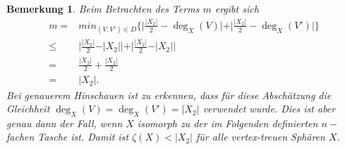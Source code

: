 \documentclass[12pt,titlepage,twoside,cleardoublepage]{article}
\theoremstyle{nummermitklammern}
\newtheorem{bemerkung}[temp]{Bemerkung}
\newtheorem{bemerkung}[zahl]{Bemerkung}
\numberwithin{equation}{section}
\begin{document}
\begin{bemerkung}
Beim Betrachten des Terms $m$ ergibt sich
\begin{align*}
m=&min_{(V,V')\in D}\{\vert\frac{\vert X_2 \vert}{2}-\deg_X(V)\vert +\vert \frac{\vert X_2 \vert}{2}-\deg_X(V')\vert\}\\
\leq& \vert\frac{\vert X_2 \vert}{2}-\vert X_2\vert\vert +\vert \frac{\vert X_2 \vert}{2}-\vert X_2\vert\vert \\
=&\frac{\vert X_2 \vert}{2}+\frac{\vert X_2 \vert}{2}\\
=&\vert X_2 \vert.
\end{align*}
Bei genauerem Hinschauen ist zu erkennen, dass für diese Abschätzung die Gleichheit $\deg_X(V)=\deg_X(V')=\vert X_2 \vert$ verwendet wurde. Dies ist aber genau dann der Fall, wenn $X$ isomorph zu der im Folgenden definierten $n-$fachen Tasche ist. 
Damit ist $\zeta (X)< \vert X_2 \vert$ für alle vertex-treuen Sphären $X$. 
\end{bemerkung}
\end{document}
